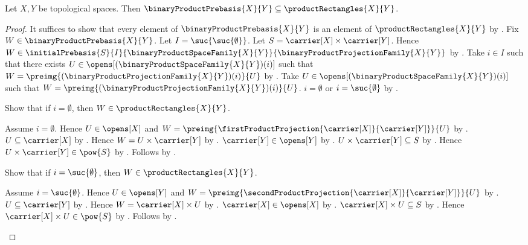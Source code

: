 \begin{proposition}\label{binary_product_prebasis_is_rectangular}
    Let $X,Y$ be topological spaces.
    Then $\binaryProductPrebasis{X}{Y}
        \subseteq\productRectangles{X}{Y}$.
\end{proposition}
\begin{proof}
    It suffices to show that every element of
        $\binaryProductPrebasis{X}{Y}$ is an element of
        $\productRectangles{X}{Y}$ by .
    Fix $W\in\binaryProductPrebasis{X}{Y}$.
    Let $I=\suc{\suc{\emptyset}}$.
    Let $S=\carrier[X]\times\carrier[Y]$.
    Hence $W\in\initialPrebasis{S}{I}{
        \binaryProductSpaceFamily{X}{Y}}{
        \binaryProductProjectionFamily{X}{Y}}$ by
        .
    Take $i\in I$ such that there exists
        $U\in\opens[(\binaryProductSpaceFamily{X}{Y})(i)]$ such that
        $W=\preimg{(\binaryProductProjectionFamily{X}{Y})(i)}{U}$ by
        .
    Take $U\in\opens[(\binaryProductSpaceFamily{X}{Y})(i)]$ such that
        $W=\preimg{(\binaryProductProjectionFamily{X}{Y})(i)}{U}$.
    $i=\emptyset$ or $i=\suc{\emptyset}$ by
        .

    Show that if $i=\emptyset$, then $W\in\productRectangles{X}{Y}$.
    \begin{subproof}
        Assume $i=\emptyset$.
        Hence $U\in\opens[X]$ and
            $W=\preimg{
                \firstProductProjection{\carrier[X]}{\carrier[Y]}}{U}$
            by
            .
        $U\subseteq\carrier[X]$ by .
        Hence $W=U\times\carrier[Y]$ by
            .
        $\carrier[Y]\in\opens[Y]$ by .
        $U\times\carrier[Y]\subseteq S$ by
            .
        Hence $U\times\carrier[Y]\in\pow{S}$ by
            .
        Follows by .
    \end{subproof}

    Show that if $i=\suc{\emptyset}$, then
        $W\in\productRectangles{X}{Y}$.
    \begin{subproof}
        Assume $i=\suc{\emptyset}$.
        Hence $U\in\opens[Y]$ and
            $W=\preimg{
                \secondProductProjection{\carrier[X]}{\carrier[Y]}}{U}$
            by
            .
        $U\subseteq\carrier[Y]$ by .
        Hence $W=\carrier[X]\times U$ by
            .
        $\carrier[X]\in\opens[X]$ by .
        $\carrier[X]\times U\subseteq S$ by
            .
        Hence $\carrier[X]\times U\in\pow{S}$ by
            .
        Follows by .
    \end{subproof}
\end{proof}

